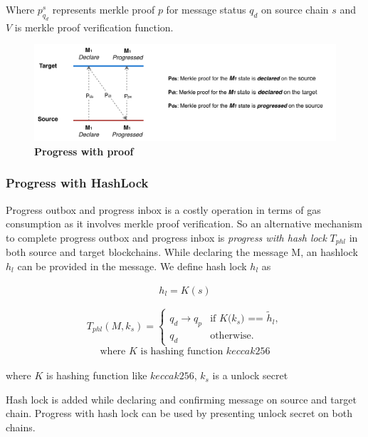 \documentclass[12pt,a4paper]{article}
\begin{document}
Where $p^s_{q_d}$ represents merkle proof $p$ for message status $q_d$ on source chain $s$ and $V$ is merkle proof verification function.

\begin{figure}[htb]
    \centering
	\includegraphics[width=\textwidth]{progress_with_proof}
	\caption{\textbf{Progress with proof}}
	\label{fig:progress_with_proof}
\end{figure}

\subsubsection{Progress with HashLock}\label{gateway:progresshashlock} 

Progress outbox  and progress inbox is a costly operation in terms of gas consumption as it involves merkle proof verification. 
So an alternative mechanism to complete progress outbox and progress inbox is \emph{progress with hash lock} $T_{phl}$  in both source and target blockchains. 
While declaring the message M, an hashlock $h_l$ can be provided in the message. We define hash lock $h_l$ as

\begin{align}
	h_l = K(s)
\end{align}

\begin{equation*}
T_{phl}(M,k_s)=\begin{cases}
q_d \rightarrow q_p & \text{if $K$($k_s$) == $\tilde{h}_l$},\\
q_d& \text{otherwise}.
\end{cases}
\end{equation*}
\begin{align*}
\text{where $K$ is hashing function $keccak256$}
\end{align*}

where $K$ is hashing function like $keccak256$, $k_s$ is a unlock secret 

Hash lock is added while declaring and confirming message on source and target chain. 
Progress with hash lock can be used by presenting unlock secret on both chains.
\end{document}
